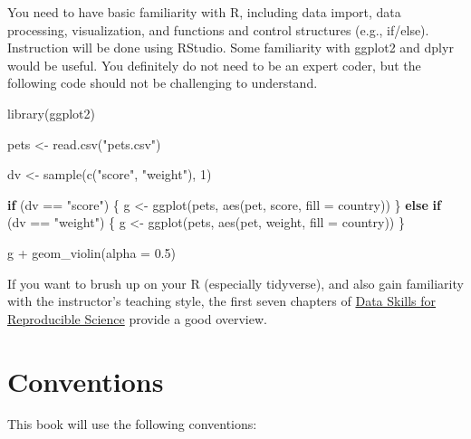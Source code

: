 \documentclass[
  oneside]{book}
\newenvironment{Shaded}{\begin{snugshade}}{\end{snugshade}}
\newcommand{\AttributeTok}[1]{\textcolor[rgb]{0.77,0.63,0.00}{#1}}
\newcommand{\ControlFlowTok}[1]{\textcolor[rgb]{0.13,0.29,0.53}{\textbf{#1}}}
\newcommand{\DecValTok}[1]{\textcolor[rgb]{0.00,0.00,0.81}{#1}}
\newcommand{\FloatTok}[1]{\textcolor[rgb]{0.00,0.00,0.81}{#1}}
\newcommand{\FunctionTok}[1]{\textcolor[rgb]{0.00,0.00,0.00}{#1}}
\newcommand{\NormalTok}[1]{#1}
\newcommand{\OtherTok}[1]{\textcolor[rgb]{0.56,0.35,0.01}{#1}}
\newcommand{\SpecialCharTok}[1]{\textcolor[rgb]{0.00,0.00,0.00}{#1}}
\newcommand{\StringTok}[1]{\textcolor[rgb]{0.31,0.60,0.02}{#1}}
\begin{document}
You need to have basic familiarity with R, including data import, data processing, visualization, and functions and control structures (e.g., if/else). Instruction will be done using RStudio. Some familiarity with ggplot2 and dplyr would be useful. You definitely do not need to be an expert coder, but the following code should not be challenging to understand.

\begin{Shaded}
\begin{Highlighting}[]
\FunctionTok{library}\NormalTok{(ggplot2)}

\NormalTok{pets }\OtherTok{\textless{}{-}} \FunctionTok{read.csv}\NormalTok{(}\StringTok{"pets.csv"}\NormalTok{)}

\NormalTok{dv }\OtherTok{\textless{}{-}} \FunctionTok{sample}\NormalTok{(}\FunctionTok{c}\NormalTok{(}\StringTok{"score"}\NormalTok{, }\StringTok{"weight"}\NormalTok{), }\DecValTok{1}\NormalTok{)}

\ControlFlowTok{if}\NormalTok{ (dv }\SpecialCharTok{==} \StringTok{"score"}\NormalTok{) \{}
\NormalTok{  g }\OtherTok{\textless{}{-}} \FunctionTok{ggplot}\NormalTok{(pets, }\FunctionTok{aes}\NormalTok{(pet, score, }\AttributeTok{fill =}\NormalTok{ country))}
\NormalTok{\} }\ControlFlowTok{else} \ControlFlowTok{if}\NormalTok{ (dv }\SpecialCharTok{==} \StringTok{"weight"}\NormalTok{) \{}
\NormalTok{  g }\OtherTok{\textless{}{-}} \FunctionTok{ggplot}\NormalTok{(pets, }\FunctionTok{aes}\NormalTok{(pet, weight, }\AttributeTok{fill =}\NormalTok{ country))}
\NormalTok{\}}

\NormalTok{g }\SpecialCharTok{+} \FunctionTok{geom\_violin}\NormalTok{(}\AttributeTok{alpha =} \FloatTok{0.5}\NormalTok{)}
\end{Highlighting}
\end{Shaded}

If you want to brush up on your R (especially tidyverse), and also gain familiarity with the instructor's teaching style, the first seven chapters of \href{https://psyteachr.github.io/msc-data-skills/}{Data Skills for Reproducible Science} provide a good overview.

\hypertarget{conventions}{%
\section{Conventions}\label{conventions}}

This book will use the following conventions:
\end{document}
